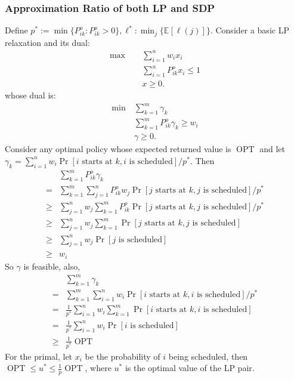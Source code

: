 \documentclass{article}
\newcommand{\E}{\mathbb{E}}
\begin{document}
\subsubsection{Approximation Ratio of both LP and SDP}
Define $p^*:=\min\{P^o_{ik}: P^o_{ik}>0\},\ell^*:\min_j\{\E[\ell(j)]\}$.
Consider a basic LP relaxation and its dual:
\begin{align*}
    \max\quad~&\sum_{i=1}^{n}w_ix_i\\
    & \sum_{i=1}^{n}P_{ik}^o x_i\leq1\\
    &x\geq 0.
\end{align*}
whose dual is:
\begin{align*}
    \min~&\sum_{k=1}^{m}\gamma_k\\
    &\sum_{k=1}^{m}P^o_{ik}\gamma_k\geq w_i\\
    &\gamma\geq 0.
\end{align*}
Consider any optimal policy whose expected returned value is $\operatorname{OPT}$ and let $\gamma_k = \sum_{i=1}^{n}w_i\Pr[i\text{ starts at }k, i\text{ is scheduled}]/p^*$.
Then
\begin{align*}
    &\sum_{k=1}^{m}P_{ik}^o\gamma_k\\
    =&\sum_{k=1}^m\sum_{j=1}^{n}P_{ik}^o w_j\Pr[j\text{ starts at }k, j\text{ is scheduled}]/p^*\\
    \geq &\sum_{j=1}^n w_j\sum_{k=1}^{m}P_{ik}^o \Pr[j\text{ starts at }k, j\text{ is scheduled}]/p^*\\
    \geq &\sum_{j=1}^n w_j\sum_{k=1}^{m}\Pr[j\text{ starts at }k, j\text{ is scheduled}]\\
    \geq &\sum_{j=1}^{n} w_j\Pr[j\text{ is scheduled}]\\
    \geq &w_i
\end{align*}
So $\gamma$ is feasible, also,
\begin{align*}
    &\sum_{k=1}^{m}\gamma_k\\
    =&\sum_{k=1}^{m}\sum_{i=1}^{n}w_i\Pr[i\text{ starts at }k, i\text{ is scheduled}]/p^*\\
    =&\frac{1}{p^*}\sum_{i=1}^{n}w_i\sum_{k=1}^{m}\Pr[i\text{ starts at }k, i\text{ is scheduled}]\\
    =&\frac{1}{p^*}\sum_{i=1}^{n}w_i\Pr[i\text{ is scheduled}]\\
    \geq &\frac{1}{p^*}\operatorname{OPT}
\end{align*}
For the primal, let $x_i$ be the probability of $i$ being scheduled, then 
$\operatorname{OPT}\leq u^*\leq \frac{1}{p}\operatorname{OPT}$, where $u^*$ is the optimal value of the LP pair.
\end{document}
